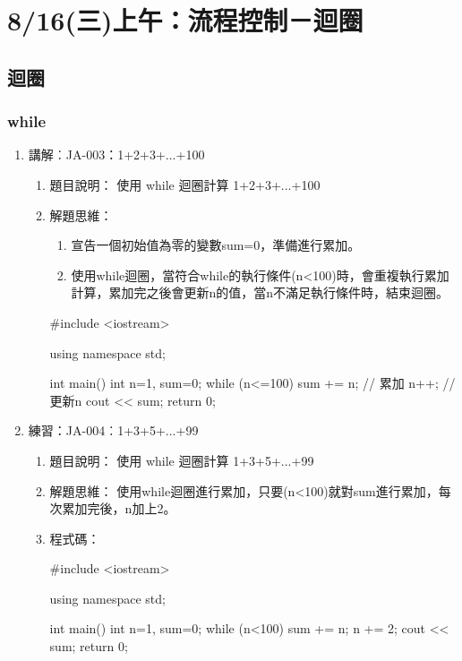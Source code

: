 
\section{8/16(三)上午：流程控制－迴圈}

\subsection{迴圈}
\subsubsection {while}
\begin{enumerate}
	\item 講解︰JA-003：1+2+3+...+100
		\begin{enumerate}
			\item 題目說明：
			\subitem 使用 while 迴圈計算 1+2+3+...+100
			
			\item 解題思維：
			\begin{enumerate}
				\item 宣告一個初始值為零的變數sum=0，準備進行累加。
				\item 使用while迴圈，當符合while的執行條件(n<100)時，會重複執行累加計算，累加完之後會更新n的值，當n不滿足執行條件時，結束迴圈。
				
			\end{enumerate}
				\begin{cppcode}
				#include <iostream>
				
				using namespace std;
				
				int main()
				{
					int n=1, sum=0;
					while (n<=100) {
						sum += n; // 累加
						n++; // 更新n
					}
					cout << sum;
					return 0;
				}
				
			\end{cppcode}
		\end{enumerate}
		
	\item 練習：JA-004︰1+3+5+...+99
		\begin{enumerate}
			\item 題目說明：
			\subitem 使用 while 迴圈計算 1+3+5+...+99
			
			\item 解題思維：
			\subitem 使用while迴圈進行累加，只要(n<100)就對sum進行累加，每次累加完後，n加上2。
			
			\item 程式碼：
			\begin{cppcode}
				#include <iostream>
				
				using namespace std;
				
				int main()
				{
					int n=1, sum=0;
					while (n<100) {
						sum += n;
						n += 2;
					}
					cout << sum;
					return 0;
				}
				
			\end{cppcode}
		\end{enumerate}
	
\end{enumerate}

